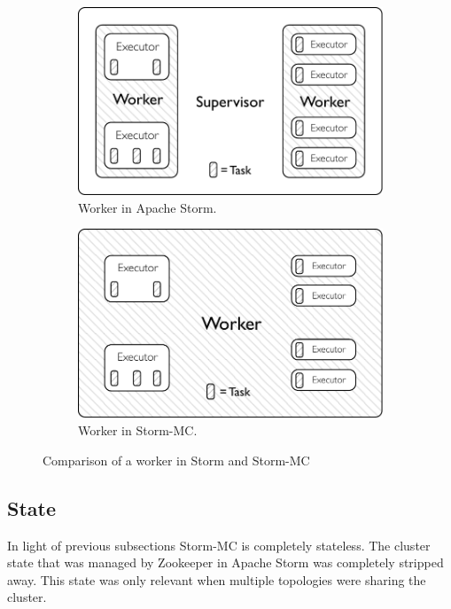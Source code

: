 \documentclass[bsc,logo,frontabs,twoside,singlespacing,normalheadings,parskip]{infthesis}     %
\begin{document}
\begin{figure}[!htb]
\centering
\begin{subfigure}{.5\textwidth}
  \centering
  \includegraphics[width=0.95\linewidth]{pdf/distributed_worker.pdf}
  \caption{Worker in Apache Storm.}
  \label{fig:comparison1}
\end{subfigure}%
\begin{subfigure}{.5\textwidth}
  \centering
  \includegraphics[width=0.95\linewidth]{pdf/local_worker.pdf}
  \caption{Worker in Storm-MC.}
  \label{fig:comparison2}
\end{subfigure}
\caption{Comparison of a worker in Storm and Storm-MC}
\label{fig:comparison}
\end{figure}

\subsection{State}

In light of previous subsections Storm-MC is completely stateless. The cluster state that was managed by Zookeeper in Apache Storm was completely stripped away. This state was only relevant when multiple topologies were sharing the cluster.
\end{document}
